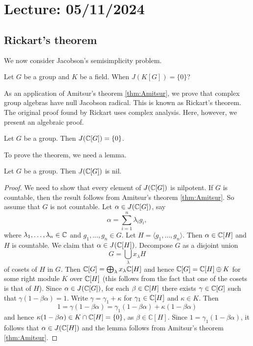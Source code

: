 \section{Lecture: 05/11/2024}

\subsection{Rickart's theorem}

We now consider Jacobson's semisimplicity problem. 

\begin{question}
\label{Jacobson's semisimplicity problem}
Let $G$ be a group and $K$ be a field. When $J(K[G])=\{0\}$?
\end{question}

As an application of Amitsur's theorem \ref{thm:Amitsur}, 
we prove that 
complex group algebras have null Jacobson radical.
This is known as 
Rickart's theorem. The original proof found by Rickart 
uses complex analysis. Here, however, 
we present an algebraic proof. 

\begin{theorem}[Rickart]
\label{thm:Rickart}
    Let $G$ be a group. Then $J(\mathbb{C}[G])=\{0\}$.
\end{theorem}

To prove the theorem, we need a lemma.

\begin{lemma}
Let $G$ be a group. Then $J(\mathbb{C}[G])$ is nil.        
\end{lemma}

\begin{proof}
    We need to show that every element of $J(\mathbb{C}[G])$ is nilpotent. 
    If $G$ is countable, then the result follows from Amitsur's theorem \ref{thm:Amitsur}. So assume that 
    $G$ is not countable. Let $\alpha\in J(\mathbb{C}[G])$, say
    \[
    \alpha=\sum_{i=1}^n\lambda_ig_i,
    \]
    where $\lambda_1,\dots,\lambda_n\in\mathbb{C}$ and $g_1,\dots,g_n\in G$. Let $H=\langle g_1,\dots,g_n\rangle$.
    Then $\alpha\in \mathbb{C}[H]$ and $H$ is countable. We claim that $\alpha\in J(\mathbb{C}[H])$. Decompose
    $G$ as a disjoint union 
    \[
    G=\bigcup_\lambda x_\lambda H
    \]
    of cosets of $H$ in $G$. Then $\mathbb{C}[G]=\bigoplus_\lambda x_\lambda\mathbb{C}[H]$ and
    hence $\mathbb{C}[G]=\mathbb{C}[H]\oplus K$ for some right module $K$ over $\mathbb{C}[H]$ (this follows
    from the fact that one of the cosets is that of $H$). Since $\alpha\in J(\mathbb{C}[G])$, for each 
    $\beta\in\mathbb{C}[H]$ there exists $\gamma\in\mathbb{C}[G]$ such that 
    $\gamma(1-\beta\alpha)=1$. Write $\gamma=\gamma_1+\kappa$ for $\gamma_1\in\mathbb{C}[H]$ and $\kappa\in K$. Then
    \[
    1=\gamma(1-\beta\alpha)=\gamma_1(1-\beta\alpha)+\kappa(1-\beta\alpha)
    \]
    and hence $\kappa(1-\beta\alpha)\in K\cap \mathbb{C}[H]=\{0\}$, as $\beta\in\mathbb{C}[H]$. 
    Since $1=\gamma_1(1-\beta\alpha)$, it follows that
    $\alpha\in J(\mathbb{C}[H])$ and the lemma follows from Amitsur's theorem \ref{thm:Amitsur}.  
\end{proof}

